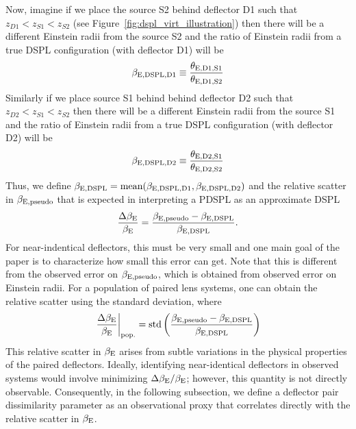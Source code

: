 \documentclass[a4paper,11pt]{article}
\begin{document}
Now, imagine if we place the source S2 behind deflector D1 such that $z_{D1} < z_{S1} < z_{S2}$ (see Figure~\ref{fig:dspl_virt_illustration}) then there will be a different Einstein radii from the source S2 and the ratio of Einstein radii from a true DSPL configuration (with deflector D1) will be 
\begin{equation}
    {\beta}_{\rm E, DSPL, D1} \equiv \frac{\theta_{\rm E, D1, S1}}{\theta_{\rm E, D1, S2}}
\end{equation}
Similarly if we place source S1 behind behind deflector D2 such that $z_{D2} < z_{S1} < z_{S2}$ then there will be a different Einstein radii from the source S1 and the ratio of Einstein radii from a true DSPL configuration (with deflector D2) will be 
\begin{equation}
    {\beta}_{\rm E, DSPL, D2} \equiv \frac{\theta_{\rm E, D2, S1}}{\theta_{\rm E, D2, S2}}
\end{equation}
Thus, we define ${\beta}_{\rm E, DSPL} = \text{mean}({\beta}_{\rm E, DSPL, D1}, {\beta}_{\rm E, DSPL, D2})$ and the relative scatter in $\beta_{\rm E, pseudo}$ that is expected in interpreting a PDSPL as an approximate DSPL
\begin{equation}\label{eqn:beta_E_relative_scatter}
    \frac{\Delta\beta_{\rm E}}{\beta_{\rm E}} = \frac{\beta_{\rm E, pseudo} - {\beta}_{\rm E, DSPL}}{\beta_{\rm E, DSPL}}.
\end{equation}
For near-indentical deflectors, this must be very small and one main goal of the paper is to characterize how small this error can get. Note that this is different from the observed error on $\beta_{\rm E, pseudo}$, which is obtained from observed error on Einstein radii.
For a population of paired lens systems, one can obtain the relative scatter using the standard deviation, where
\begin{equation}\label{eqn:beta_E_relative_scatter_population}
    \left.\frac{\Delta\beta_{\rm E}}{\beta_{\rm E}} \right|_{\rm pop.} = \text{std}\left(\frac{\beta_{\rm E, pseudo} - {\beta}_{\rm E, DSPL}}{\beta_{\rm E, DSPL}}\right)
\end{equation}
This relative scatter in $\beta_{\rm E}$ arises from subtle variations in the physical properties of the paired deflectors. Ideally, identifying near-identical deflectors in observed systems would involve minimizing $\Delta\beta_{\rm E}/\beta_{\rm E}$; however, this quantity is not directly observable. Consequently, in the following subsection, we define a deflector pair dissimilarity parameter as an observational proxy that correlates directly with the relative scatter in $\beta_{\rm E}$.
\end{document}
